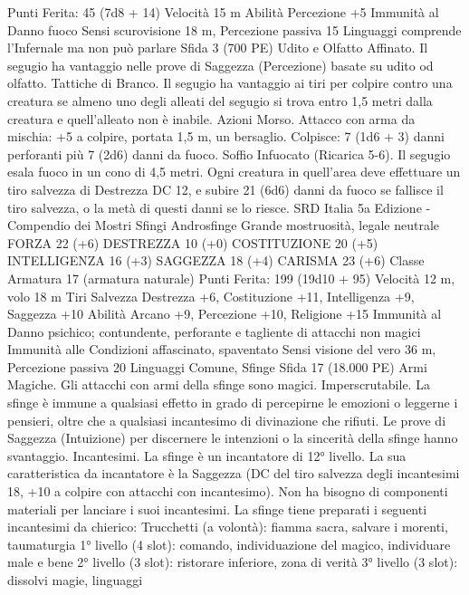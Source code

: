 \begin{multicols}{2}
\hspace*{0pt}\hfill{Punti Ferita}: 45 (7d8 + 14)
Velocità 15 m
Abilità Percezione +5
Immunità al Danno fuoco
Sensi scurovisione 18 m, Percezione passiva 15
Linguaggi comprende l’Infernale ma non può parlare
Sfida 3 (700 PE)
Udito e Olfatto Affinato. Il segugio ha vantaggio nelle prove di
Saggezza (Percezione) basate su udito od olfatto.
Tattiche di Branco. Il segugio ha vantaggio ai tiri per colpire
contro una creatura se almeno uno degli alleati del segugio si
trova entro 1,5 metri dalla creatura e quell’alleato non è inabile.
Azioni
Morso. Attacco con arma da mischia: +5 a colpire, portata 1,5
m, un bersaglio.
Colpisce: 7 (1d6 + 3) danni perforanti più 7 (2d6) danni da
fuoco.
Soffio Infuocato (Ricarica 5-6). Il segugio esala fuoco in un
cono di 4,5 metri. Ogni creatura in quell’area deve effettuare un
tiro salvezza di Destrezza DC 12, e subire 21 (6d6) danni da
fuoco se fallisce il tiro salvezza, o la metà di questi danni se lo
riesce.
SRD Italia 5a Edizione - Compendio dei Mostri
Sfingi
Androsfinge
Grande mostruosità, legale neutrale
FORZA 22 (+6)
DESTREZZA 10 (+0)
COSTITUZIONE 20 (+5)
INTELLIGENZA 16 (+3)
SAGGEZZA 18 (+4)
CARISMA 23 (+6)
Classe Armatura 17 (armatura naturale)
\hspace*{0pt}\hfill{Punti Ferita}: 199 (19d10 + 95)
Velocità 12 m, volo 18 m
Tiri Salvezza Destrezza +6, Costituzione +11, Intelligenza +9,
Saggezza +10
Abilità Arcano +9, Percezione +10, Religione +15
Immunità al Danno psichico; contundente, perforante e
tagliente di attacchi non magici
Immunità alle Condizioni affascinato, spaventato
Sensi visione del vero 36 m, Percezione passiva 20
Linguaggi Comune, Sfinge
Sfida 17 (18.000 PE)
Armi Magiche. Gli attacchi con armi della sfinge sono magici.
Imperscrutabile. La sfinge è immune a qualsiasi effetto in grado
di percepirne le emozioni o leggerne i pensieri, oltre che a
qualsiasi incantesimo di divinazione che rifiuti. Le prove di
Saggezza (Intuizione) per discernere le intenzioni o la sincerità
della sfinge hanno svantaggio.
Incantesimi. La sfinge è un incantatore di 12° livello. La sua
caratteristica da incantatore è la Saggezza (DC del tiro salvezza
degli incantesimi 18, +10 a colpire con attacchi con
incantesimo). Non ha bisogno di componenti materiali per
lanciare i suoi incantesimi. La sfinge tiene preparati i seguenti
incantesimi da chierico:
Trucchetti (a volontà): fiamma sacra, salvare i morenti,
taumaturgia
1° livello (4 slot): comando, individuazione del magico,
individuare male e bene
2° livello (3 slot): ristorare inferiore, zona di verità
3° livello (3 slot): dissolvi magie, linguaggi

\end{multicols}

